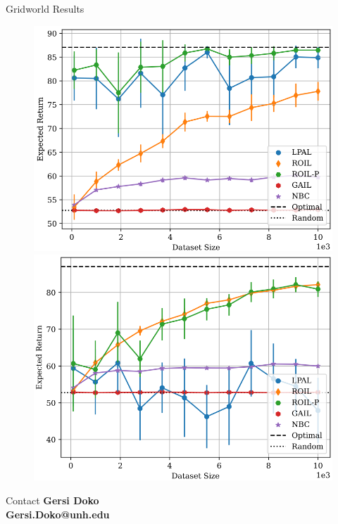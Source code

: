 \documentclass[final,a0paper]{beamer}
\begin{document}
\begin{frame}{}
\begin{columns}[t]
  \begin{column}{0.3\linewidth}
    \begin{block}{Gridworld Results}
        \begin{center}
            \begin{figure}
                \includegraphics[scale=1.5]{../../pres_roil/plots/returns/40x40_gridworld_on_policy_returns_cropped.pdf}
                \includegraphics[scale=1.5]{../../pres_roil/plots/returns/40x40_gridworld_off_policy_returns_cropped.pdf}
            \end{figure}
        \end{center}
    \end{block}

    \begin{block}{Contact}
        \textbf{Gersi Doko}\\
        \textbf{Gersi.Doko@unh.edu}
    \end{block}
  \end{column}
\end{columns}
\end{frame}
\end{document}
